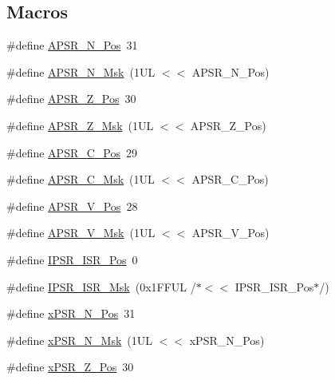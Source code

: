 \subsection*{Macros}
\begin{DoxyCompactItemize}
\item 
\#define \hyperlink{group__CMSIS__CORE_gac469528d210043c7bd3f12f0e6824766}{A\+P\+S\+R\+\_\+\+N\+\_\+\+Pos}~31
\item 
\#define \hyperlink{group__CMSIS__CORE_gadbc2cf55a026f661b53fadfcf822cef1}{A\+P\+S\+R\+\_\+\+N\+\_\+\+Msk}~(1\+U\+L $<$$<$ A\+P\+S\+R\+\_\+\+N\+\_\+\+Pos)
\item 
\#define \hyperlink{group__CMSIS__CORE_ga3661286d108b1aca308d7445685eae3a}{A\+P\+S\+R\+\_\+\+Z\+\_\+\+Pos}~30
\item 
\#define \hyperlink{group__CMSIS__CORE_ga1deb4d1aa72bb83d1f79329406f15711}{A\+P\+S\+R\+\_\+\+Z\+\_\+\+Msk}~(1\+U\+L $<$$<$ A\+P\+S\+R\+\_\+\+Z\+\_\+\+Pos)
\item 
\#define \hyperlink{group__CMSIS__CORE_ga6cf72aa6f09a168f9e5beda1a4a887b9}{A\+P\+S\+R\+\_\+\+C\+\_\+\+Pos}~29
\item 
\#define \hyperlink{group__CMSIS__CORE_ga6d47803fbad455bc10bd1ce59f2f335d}{A\+P\+S\+R\+\_\+\+C\+\_\+\+Msk}~(1\+U\+L $<$$<$ A\+P\+S\+R\+\_\+\+C\+\_\+\+Pos)
\item 
\#define \hyperlink{group__CMSIS__CORE_gac62830f67679ccd11658c4172c3e6ea7}{A\+P\+S\+R\+\_\+\+V\+\_\+\+Pos}~28
\item 
\#define \hyperlink{group__CMSIS__CORE_ga33305d6701356bff6890b315fe8b5489}{A\+P\+S\+R\+\_\+\+V\+\_\+\+Msk}~(1\+U\+L $<$$<$ A\+P\+S\+R\+\_\+\+V\+\_\+\+Pos)
\item 
\#define \hyperlink{group__CMSIS__CORE_ga0e34027584d02c43811ae908a5ca9adf}{I\+P\+S\+R\+\_\+\+I\+S\+R\+\_\+\+Pos}~0
\item 
\#define \hyperlink{group__CMSIS__CORE_gaf013a4579a64d1f21f56ea9f1b33ab56}{I\+P\+S\+R\+\_\+\+I\+S\+R\+\_\+\+Msk}~(0x1\+F\+F\+U\+L /$\ast$$<$$<$ I\+P\+S\+R\+\_\+\+I\+S\+R\+\_\+\+Pos$\ast$/)
\item 
\#define \hyperlink{group__CMSIS__CORE_ga031eb1b8ebcdb3d602d0b9f2ec82a7ae}{x\+P\+S\+R\+\_\+\+N\+\_\+\+Pos}~31
\item 
\#define \hyperlink{group__CMSIS__CORE_gaf600f4ff41b62cf2f3b0a59b6d2e93d6}{x\+P\+S\+R\+\_\+\+N\+\_\+\+Msk}~(1\+U\+L $<$$<$ x\+P\+S\+R\+\_\+\+N\+\_\+\+Pos)
\item 
\#define \hyperlink{group__CMSIS__CORE_ga5869dd608eea73c80f0567d781d2230b}{x\+P\+S\+R\+\_\+\+Z\+\_\+\+Pos}~30
\item 
$$
\end{DoxyCompactItemize}

